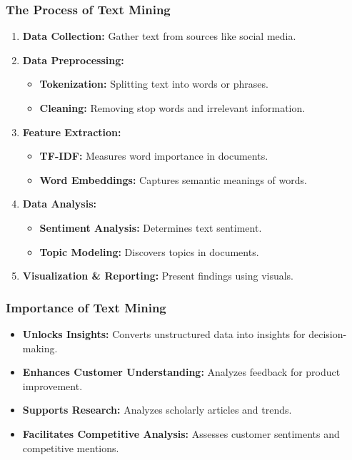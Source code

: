 \documentclass[aspectratio=169]{beamer}
\begin{document}
\begin{frame}[fragile]
    \frametitle{The Process of Text Mining}
    \begin{enumerate}
        \item \textbf{Data Collection:} Gather text from sources like social media.
        \item \textbf{Data Preprocessing:}
            \begin{itemize}
                \item \textbf{Tokenization:} Splitting text into words or phrases.
                \item \textbf{Cleaning:} Removing stop words and irrelevant information.
            \end{itemize}
        \item \textbf{Feature Extraction:}
            \begin{itemize}
                \item \textbf{TF-IDF:} Measures word importance in documents.
                \item \textbf{Word Embeddings:} Captures semantic meanings of words.
            \end{itemize}
        \item \textbf{Data Analysis:}
            \begin{itemize}
                \item \textbf{Sentiment Analysis:} Determines text sentiment.
                \item \textbf{Topic Modeling:} Discovers topics in documents.
            \end{itemize}
        \item \textbf{Visualization \& Reporting:} Present findings using visuals.
    \end{enumerate}
\end{frame}

\begin{frame}[fragile]
    \frametitle{Importance of Text Mining}
    \begin{itemize}
        \item \textbf{Unlocks Insights:} Converts unstructured data into insights for decision-making.
        \item \textbf{Enhances Customer Understanding:} Analyzes feedback for product improvement.
        \item \textbf{Supports Research:} Analyzes scholarly articles and trends.
        \item \textbf{Facilitates Competitive Analysis:} Assesses customer sentiments and competitive mentions.
    \end{itemize}
\end{frame}
\end{document}
